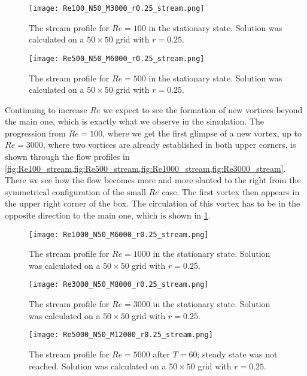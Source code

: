 \documentclass[10pt,a4paper,twocolumn]{article}
\begin{document}
\begin{figure}[!b]
    \centering
    \texttt{[image: Re100\_N50\_M3000\_r0.25\_stream.png]}
    \caption{The stream profile for $Re=100$ in the stationary state. Solution was calculated on a $50 \times 50$ grid with $r=0.25$.}
    \label{fig:Re100_stream}
\end{figure}

\begin{figure}[!b]
    \centering
    \texttt{[image: Re500\_N50\_M6000\_r0.25\_stream.png]}
    \caption{The stream profile for $Re=500$ in the stationary state. Solution was calculated on a $50 \times 50$ grid with $r=0.25$.}
    \label{fig:Re500_stream}
\end{figure}

Continuing to increase $Re$ we expect to see the formation of new vortices beyond the main one, which is exactly what we observe in the simulation. The progression from $Re=100$, where we get the first glimpse of a new vortex, up to $Re=3000$, where two vortices are already established in both upper corners, is shown through the flow profiles in \cref{fig:Re100_stream,fig:Re500_stream,fig:Re1000_stream,fig:Re3000_stream}. There we see how the flow becomes more and more slanted to the right from the symmetrical configuration of the small $Re$ case. The first vortex then appears in the upper right corner of the box. The circulation of this vortex has to be in the opposite direction to the main one, which is shown in \cref{fig:Re100_stream}.


\begin{figure}[!b]
    \centering
    \texttt{[image: Re1000\_N50\_M6000\_r0.25\_stream.png]}
    \caption{The stream profile for $Re=1000$ in the stationary state. Solution was calculated on a $50 \times 50$ grid with $r=0.25$.}
    \label{fig:Re1000_stream}
\end{figure}

\begin{figure}[!b]
    \centering
    \texttt{[image: Re3000\_N50\_M8000\_r0.25\_stream.png]}
    \caption{The stream profile for $Re=3000$ in the stationary state. Solution was calculated on a $50 \times 50$ grid with $r=0.25$.}
    \label{fig:Re3000_stream}
\end{figure}

\begin{figure}[!t]
    \centering
    \texttt{[image: Re5000\_N50\_M12000\_r0.25\_stream.png]}
    \caption{The stream profile for $Re=5000$ after $T=60$; steady state was not reached. Solution was calculated on a $50 \times 50$ grid with $r=0.25$.}
    \label{fig:Re5000_stream}
\end{figure}
\end{document}
